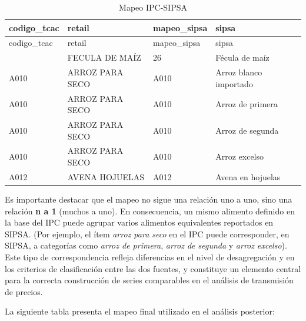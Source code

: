 \documentclass[
  12pt,
]{article}
\begin{document}
\begin{longtable}[]{@{}llll@{}}
\caption{Mapeo IPC-SIPSA}\tabularnewline
\toprule\noalign{}
codigo\_tcac & retail & mapeo\_sipsa & sipsa \\
\midrule\noalign{}
\endfirsthead
\toprule\noalign{}
codigo\_tcac & retail & mapeo\_sipsa & sipsa \\
\midrule\noalign{}
\endhead
\bottomrule\noalign{}
\endlastfoot
26 & FECULA DE MAÍZ & 26 & Fécula de maíz \\
A010 & ARROZ PARA SECO & A010 & Arroz blanco importado \\
A010 & ARROZ PARA SECO & A010 & Arroz de primera \\
A010 & ARROZ PARA SECO & A010 & Arroz de segunda \\
A010 & ARROZ PARA SECO & A010 & Arroz excelso \\
A012 & AVENA HOJUELAS & A012 & Avena en hojuelas \\
\end{longtable}

Es importante destacar que el mapeo no sigue una relación uno a uno,
sino una relación \textbf{n a 1} (muchos a uno). En consecuencia, un
mismo alimento definido en la base del IPC puede agrupar varios
alimentos equivalentes reportados en SIPSA. (Por ejemplo, el ítem
\emph{arroz para seco} en el IPC puede corresponder, en SIPSA, a
categorías como \emph{arroz de primera}, \emph{arroz de segunda} y
\emph{arroz excelso}). Este tipo de correspondencia refleja diferencias
en el nivel de desagregación y en los criterios de clasificación entre
las dos fuentes, y constituye un elemento central para la correcta
construcción de series comparables en el análisis de transmisión de
precios.

La siguiente tabla presenta el mapeo final utilizado en el análisis
posterior:
\end{document}
